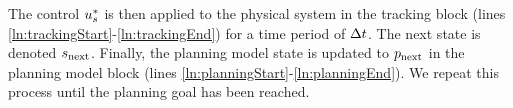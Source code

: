 The control $u_s^*$ is then applied to the physical system in the tracking block (lines \ref{ln:trackingStart}-\ref{ln:trackingEnd}) for a time period of $\Delta t$. 
The next state is denoted $s_\text{next}$. 
Finally, the planning model state is updated to $p_\text{next}$ in the planning model block (lines \ref{ln:planningStart}-\ref{ln:planningEnd}). 
We repeat this process until the planning goal has been reached.